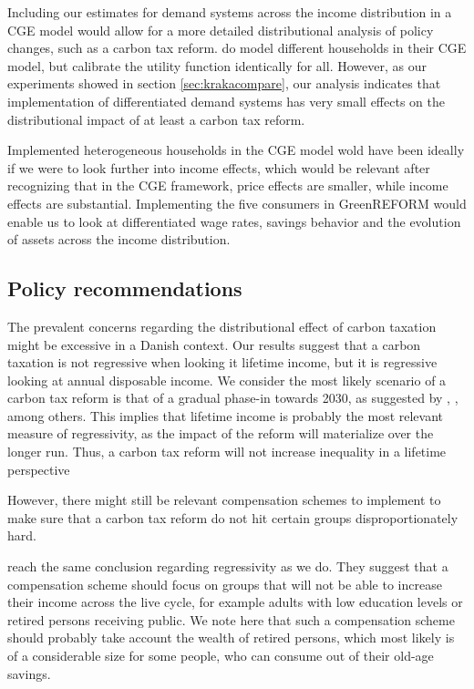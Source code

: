 Including our estimates for demand systems across the income distribution in a CGE model would allow for a more detailed distributional analysis of policy changes, such as a carbon tax reform. \cite{dmoer2009} do model different households in their CGE model, but calibrate the utility function identically for all. However, as our experiments showed in section \ref{sec:krakacompare}, our analysis indicates that implementation of differentiated demand systems has very small effects on the distributional impact of at least a carbon tax reform.

Implemented heterogeneous households in the CGE model wold have been ideally if we were to look further into income effects, which would be relevant after recognizing that in the CGE framework, price effects are smaller, while income effects are substantial. Implementing the five consumers in GreenREFORM would enable us to look at differentiated wage rates, savings behavior and the evolution of assets across the income distribution.

\subsection{Policy recommendations}
The prevalent concerns regarding the distributional effect of carbon taxation might be excessive in a Danish context. Our results suggest that a carbon taxation is not regressive when looking it lifetime income, but it is regressive looking at annual disposable income. We consider the most likely scenario of a carbon tax reform is that of a gradual phase-in towards 2030, as suggested by \cite{Kraka2020}, \cite{klimaraad2021}, \cite{dmoer2021} among others. This implies that lifetime income is probably the most relevant measure of regressivity, as the impact of the reform will materialize over the longer run. Thus, a carbon tax reform will not increase inequality in a lifetime perspective

However, there might still be relevant compensation schemes to implement to make sure that a carbon tax reform do not hit certain groups disproportionately hard. 

\cite{Wier2005} reach the same conclusion regarding regressivity as we do. They suggest that a compensation scheme should focus on groups that will not be able to increase their income across the live cycle, for example adults with low education levels or retired persons receiving public. We note here that such a compensation scheme should probably take account the wealth of retired persons, which most likely is of a considerable size for some people, who can consume out of their old-age savings. 

